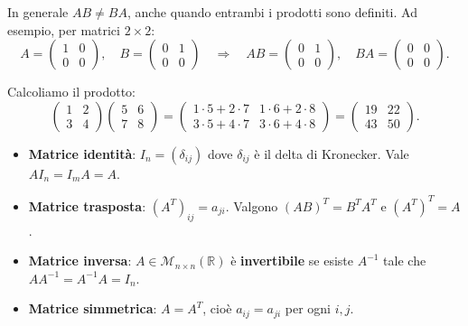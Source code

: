 \begin{notebox}
In generale $AB \neq BA$, anche quando entrambi i prodotti sono definiti. Ad esempio, per matrici $2 \times 2$:
\[ A = \begin{pmatrix} 1 & 0 \\ 0 & 0 \end{pmatrix}, \quad B = \begin{pmatrix} 0 & 1 \\ 0 & 0 \end{pmatrix} \quad \Longrightarrow \quad AB = \begin{pmatrix} 0 & 1 \\ 0 & 0 \end{pmatrix}, \quad BA = \begin{pmatrix} 0 & 0 \\ 0 & 0 \end{pmatrix}. \]
\end{notebox}

\begin{examplebox}
Calcoliamo il prodotto:
\[ \begin{pmatrix} 1 & 2 \\ 3 & 4 \end{pmatrix} \begin{pmatrix} 5 & 6 \\ 7 & 8 \end{pmatrix} = \begin{pmatrix} 1 \cdot 5 + 2 \cdot 7 & 1 \cdot 6 + 2 \cdot 8 \\ 3 \cdot 5 + 4 \cdot 7 & 3 \cdot 6 + 4 \cdot 8 \end{pmatrix} = \begin{pmatrix} 19 & 22 \\ 43 & 50 \end{pmatrix}. \]
\end{examplebox}

\begin{definitionbox}
\begin{itemize}
    \item \textbf{Matrice identità}: $I_n = (\delta_{ij})$ dove $\delta_{ij}$ è il delta di Kronecker. Vale $AI_n = I_m A = A$.
    \item \textbf{Matrice trasposta}: $(A^T)_{ij} = a_{ji}$. Valgono $(AB)^T = B^T A^T$ e $(A^T)^T = A$.
    \item \textbf{Matrice inversa}: $A \in \mathcal{M}_{n \times n}(\mathbb{R})$ è \textbf{invertibile} se esiste $A^{-1}$ tale che $AA^{-1} = A^{-1}A = I_n$.
    \item \textbf{Matrice simmetrica}: $A = A^T$, cioè $a_{ij} = a_{ji}$ per ogni $i, j$.
\end{itemize}
\end{definitionbox}

